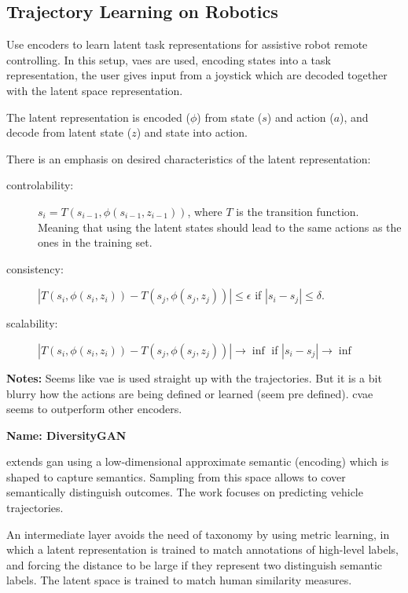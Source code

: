 \subsection{Trajectory Learning on Robotics}\label{sec: traj learning robotics}


\cite{losey2020controlling} Use encoders to learn latent task representations for assistive robot remote controlling. In this setup, \glspl{vae} are used, encoding states into a task representation, the user gives input from a joystick which are decoded together with the latent space representation.

The latent representation is encoded ($\phi$) from state ($s$) and action ($a$), and decode from latent state ($z$) and state into action.

There is an emphasis on desired characteristics of the latent representation:

\begin{description}
	\item[controlability:] $s_i = T(s_{i-1}, \phi(s_{i-1}, z_{i-1}))$, where $T$ is the transition function. Meaning that using the latent states should lead to the same actions as the ones in the training set.
	\item[consistency:] $|T(s_{i}, \phi(s_{i}, z_{i})) - T(s_{j}, \phi(s_{j}, z_{j}))| \leq \epsilon$ if $|s_i-s_j|\leq \delta$.
	\item[scalability:] $|T(s_{i}, \phi(s_{i}, z_{i})) - T(s_{j}, \phi(s_{j}, z_{j}))| \rightarrow \inf$ if $|s_i-s_j| \rightarrow \inf$
\end{description}

\textbf{Notes:} Seems like \gls{vae} is used straight up with the trajectories. But it is a bit blurry how the actions are being defined or learned (seem pre defined). \gls{cvae} seems to outperform other encoders.


\textbf{Name: DiversityGAN}

\cite{huang2020diversitygan} extends \gls{gan} using a low-dimensional approximate semantic (encoding) which is shaped to capture semantics. Sampling from this space allows to cover semantically distinguish outcomes. The work focuses on predicting vehicle trajectories.

An intermediate layer avoids the need of taxonomy  by using metric learning, in which a latent representation is trained to match annotations of high-level labels, and forcing the distance to be large if they represent two distinguish semantic labels.
%
The latent space is trained to match human similarity measures.

